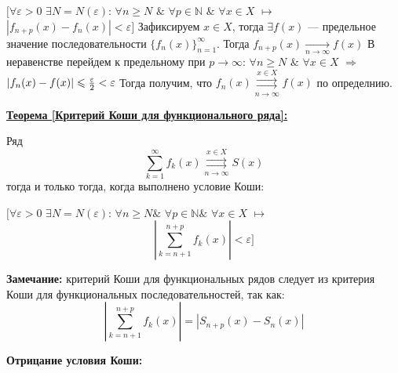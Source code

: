 \documentclass[a4paper,12pt]{article} %
\renewcommand {\geq}{\geqslant}
\renewcommand {\leq}{\leqslant}
\begin{document}
\hspace*{5mm}$\big[\forall \varepsilon > 0 $  $\exists N = N(\varepsilon)$: $\forall n \geq N$  $\&$ $\forall p \in  \mathds{N}$ $\&$ $\forall x \in X$ $\longmapsto$ \newline 
\hspace*{50mm}$|f_{n+p}(x) -f_n(x)| < \varepsilon\big]$
\newline \newline 
Зафиксируем $x \in X$, тогда $\exists f(x)$ --- предельное значение последовательности $\{f_n(x)\}_{n=1}^\infty$. \newline \newline 
Тогда $f_{n+p}(x) \underset{n \longrightarrow \infty}{\longrightarrow} f(x)$ \newline \newline 
В неравенстве перейдем к предельному при $p \longrightarrow \infty$:\newline 
\hspace*{20mm}$\forall n \geq N$ $\&$ $\forall x \in X$ $\Rightarrow$ $|f_n(x) - f(x)| \leq {\varepsilon \over 2} < \varepsilon$  
\newline \newline 
Тогда получим, что $f_n(x) \overset{x \in X}{\underset{n \rightarrow \infty}{\rightrightarrows}} f(x)$ по определнию.
\newline \newline 

\noindent \underline{\textbf{Теорема [Критерий Коши для функционального ряда]:}}

Ряд $$\sum\limits_{k = 1}^{\infty}  f_k(x) \overset{x \in X}{\underset{n \rightarrow \infty}{\rightrightarrows}} S(x)$$ тогда и только тогда, когда выполнено условие Коши: 
\newline 

\hspace*{5mm}$\big[\forall \varepsilon > 0 $  $\exists N = N(\varepsilon)$: $\forall n \geq N \& $   $\forall p \in  \mathds{N} \&$ $\forall x \in X$ $\longmapsto$ \newline 
\hspace*{50mm}$$|\sum\limits_{k = n+1}^{n+p}f_k(x)| < \varepsilon\big]$$

\textbf{Замечание:} критерий Коши для функциональных рядов следует из критерия Коши для функциональных последовательностей, так как: \newline 
$$|\sum\limits_{k = n+1}^{n+p} f_k(x)| =| S_{n+p}(x) - S_n(x)|$$

\textbf{Отрицание условия Коши:} 
\newline 
\end{document}
